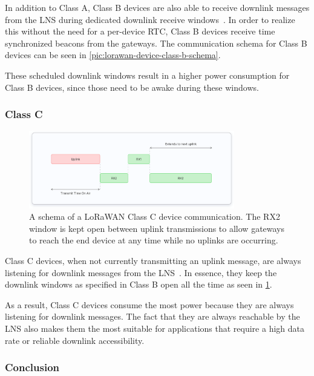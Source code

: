 In addition to Class A, Class B devices are also able to receive downlink messages from the \ac{LNS} during dedicated downlink receive windows~\cite[p. 67]{lora_alliance_inc_lorawan_specification_2017}.
In order to realize this without the need for a per-device \ac{RTC}, Class B devices receive time synchronized beacons from the gateways.
The communication schema for Class B devices can be seen in \cref{pic:lorawan-device-class-b-schema}.

These scheduled downlink windows result in a higher power consumption for Class B devices, since those need to be awake during these windows.

\subsubsection{Class C}

\begin{figure}[htbp]
    \centering
    \includegraphics[width=0.8\textwidth]{pictures/device-classes/class-c.png}
    \caption{
        A schema of a \ac{LoRaWAN} Class C device communication.
        The RX2 window is kept open between uplink transmissions to allow gateways to reach the end device at any time while no uplinks are occurring.~\protect\cite{the_things_industries_bv_device_nodate}
    }\label{pic:lorawan-device-class-c-schema}
\end{figure}

Class C devices, when not currently transmitting an uplink message, are always listening for downlink messages from the \ac{LNS}~\cite[p. 86]{lora_alliance_inc_lorawan_specification_2017}.
In essence, they keep the downlink windows as specified in Class B open all the time as seen in \cref{pic:lorawan-device-class-c-schema}.

As a result, Class C devices consume the most power because they are always listening for downlink messages.
The fact that they are always reachable by the \ac{LNS} also makes them the most suitable for applications that require a high data rate or reliable downlink accessibility.

\subsubsection{Conclusion}


